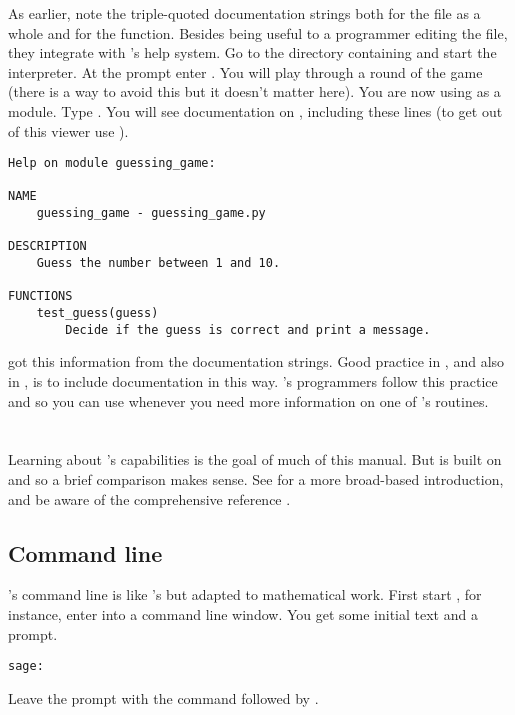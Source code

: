 As earlier, note the triple-quoted documentation strings both for the 
file as a whole and for the function.
Besides being useful to a programmer editing the file, 
they integrate with \python's help system. 
Go to the directory containing  and start 
the \python{} interpreter.
At the \inlinecode{>>>} prompt enter .
You will play through a round of the game (there is a way to avoid this
but it doesn't matter here).
You are now using  as a module.
Type
.
You will see documentation on , 
including these lines
(to get out of this viewer use ).
\begin{lstlisting}
Help on module guessing_game:

NAME
    guessing_game - guessing_game.py

DESCRIPTION
    Guess the number between 1 and 10.

FUNCTIONS
    test_guess(guess)
        Decide if the guess is correct and print a message.
\end{lstlisting}
\python{} got this information from the documentation strings.
Good practice in \python{}, and also in \Sage,  is 
to include documentation in this way.
\Sage's programmers follow this practice and so 
you can use  
whenever you need more information on one of 
\Sage's routines.





\section{\Sage}
Learning about \Sage's capabilities is the goal of much of this manual.
But \Sage{} is built on \python{} and so a brief comparison makes sense.
See \citep{SageTeam19} for a more broad-based introduction, and 
be aware of the comprehensive reference \citep{SageTeam19ref}.



\subsection{Command line}
\Sage's command line is like \python's but adapted to 
mathematical work.
First start \Sage,
for instance, enter  into a command line window.
You get some initial text and a prompt.
\begin{lstlisting}[style=python]
sage:  
\end{lstlisting}
Leave the prompt with the command 
followed by .

